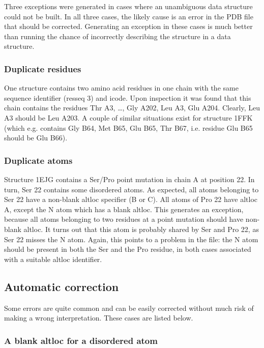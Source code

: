 Three exceptions were generated in cases where an unambiguous data structure
could not be built. In all three cases, the likely cause is an error in the
PDB file that should be corrected. Generating an exception in these cases
is much better than running the chance of incorrectly describing
the structure in a data structure.

\subsubsection{Duplicate residues}

One structure contains two amino acid residues in one chain with the same sequence
identifier (resseq 3) and icode. Upon inspection it was found that this chain
contains the residues Thr A3, \ldots, Gly A202, Leu A3, Glu A204. Clearly,
Leu A3 should be Leu A203. A couple of similar situations exist for structure
1FFK (which e.g. contains Gly B64, Met B65, Glu B65, Thr B67, i.e. residue Glu
B65 should be Glu B66).

\subsubsection{Duplicate atoms}

Structure 1EJG contains a Ser/Pro point mutation in chain A at position 22.
In turn, Ser 22 contains some disordered atoms. As expected, all atoms belonging
to Ser 22 have a non-blank altloc specifier (B or C). All atoms of Pro 22 have
altloc A, except the N atom which has a blank altloc. This generates an exception,
because all atoms belonging to two residues at a point mutation should have
non-blank altloc. It turns out that this atom is probably shared by Ser and
Pro 22, as Ser 22 misses the N atom. Again, this points to a problem in the
file: the N atom should be present in both the Ser and the Pro residue, in both
cases associated with a suitable altloc identifier.

\subsection{Automatic correction}

Some errors are quite common and can be easily corrected without much risk of
making a wrong interpretation. These cases are listed below.

\subsubsection{A blank altloc for a disordered atom}

